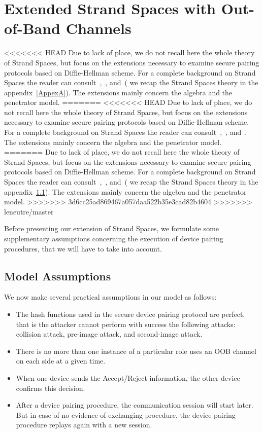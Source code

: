 \section{Extended Strand Spaces with Out-of-Band Channels}\label{extended-strand}

<<<<<<< HEAD
Due to lack of place, we do not recall here the whole theory of Strand Spaces, but focus on the extensions necessary to examine secure pairing protocols based on Diffie-Hellman scheme. For a complete background on Strand Spaces the reader can consult~\cite{674832},~\cite{Guttman:2002:ATS:568264.568267}, and~\cite{1212716}( we recap the Strand Spaces theory in the appendix~\ref{AppexA}). The extensions mainly concern the algebra and the penetrator model.
=======
<<<<<<< HEAD
Due to lack of place, we do not recall here the whole theory of Strand Spaces, but focus on the extensions necessary to examine secure pairing protocols based on Diffie-Hellman scheme. For a complete background on Strand Spaces the reader can consult~\cite{674832},~\cite{Guttman:2002:ATS:568264.568267}, and~\cite{1212716}. The extensions mainly concern the algebra and the penetrator model.
=======
Due to lack of place, we do not recall here the whole theory of Strand Spaces, but focus on the extensions necessary to examine secure pairing protocols based on Diffie-Hellman scheme. For a complete background on Strand Spaces the reader can consult~\cite{674832},~\cite{Guttman:2002:ATS:568264.568267}, and~\cite{1212716}( we recap the Strand Spaces theory in the appendix~\ref{}). The extensions mainly concern the algebra and the penetrator model.
>>>>>>> 3d6cc25ad869467a057daa522b35e3cad82b4604
>>>>>>> leneutre/master

Before presenting our extension of Strand Spaces, we formulate some supplementary assumptions concerning the execution of device pairing procedures, that we will have to take into account.
 
\subsection{Model Assumptions}

We now make several practical assumptions in our model as follows: 
\begin{itemize}
\item The hash functions used in the secure device pairing protocol are perfect, that is the attacker cannot perform with success the following attacks: collision attack, pre-image attack, and second-image attack.
\item There is no more than one instance of a particular role uses an OOB channel on each side at a given time.
\item When one device sends the Accept/Reject information, the other device confirms this decision.
\item After a device pairing procedure, the communication session will start later. But in case of no evidence of exchanging procedure, the device pairing procedure replays again with a new session. 
\end{itemize} 

